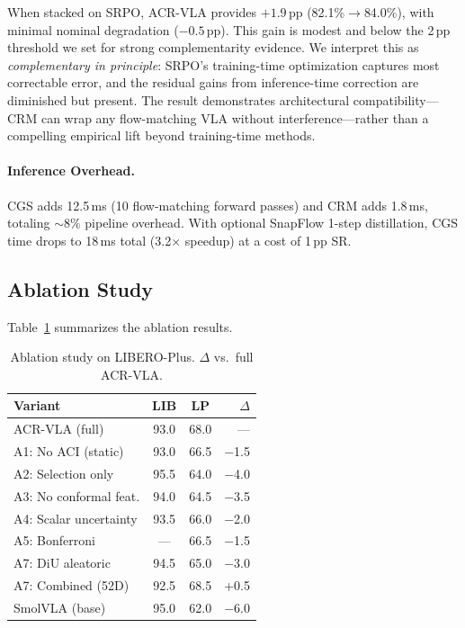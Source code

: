 \documentclass[10pt,twocolumn]{article}
\begin{document}
When stacked on SRPO, ACR-VLA provides $+1.9$\,pp (82.1\%$\to$84.0\%), with minimal nominal degradation ($-0.5$\,pp).
This gain is modest and below the 2\,pp threshold we set for strong complementarity evidence.
We interpret this as \emph{complementary in principle}: SRPO's training-time optimization captures most correctable error, and the residual gains from inference-time correction are diminished but present.
The result demonstrates architectural compatibility---CRM can wrap any flow-matching VLA without interference---rather than a compelling empirical lift beyond training-time methods.

\paragraph{Inference Overhead.}
CGS adds 12.5\,ms (10 flow-matching forward passes) and CRM adds 1.8\,ms, totaling ${\sim}8\%$ pipeline overhead.
With optional SnapFlow 1-step distillation, CGS time drops to 18\,ms total (3.2$\times$ speedup) at a cost of 1\,pp SR.

\subsection{Ablation Study}

Table~\ref{tab:ablation} summarizes the ablation results.

\begin{table}[t]
\centering
\small
\caption{Ablation study on LIBERO-Plus. $\Delta$ vs.\ full ACR-VLA.}
\label{tab:ablation}
\begin{tabular}{@{}lccr@{}}
\toprule
Variant & LIB & LP & $\Delta$ \\
\midrule
ACR-VLA (full) & 93.0 & 68.0 & --- \\
\midrule
A1: No ACI (static) & 93.0 & 66.5 & $-$1.5 \\
A2: Selection only & 95.5 & 64.0 & $-$4.0 \\
A3: No conformal feat. & 94.0 & 64.5 & $-$3.5 \\
A4: Scalar uncertainty & 93.5 & 66.0 & $-$2.0 \\
A5: Bonferroni & --- & 66.5 & $-$1.5 \\
A7: DiU aleatoric & 94.5 & 65.0 & $-$3.0 \\
A7: Combined (52D) & 92.5 & 68.5 & +0.5 \\
\midrule
SmolVLA (base) & 95.0 & 62.0 & $-$6.0 \\
\bottomrule
\end{tabular}
\end{table}
\end{document}
